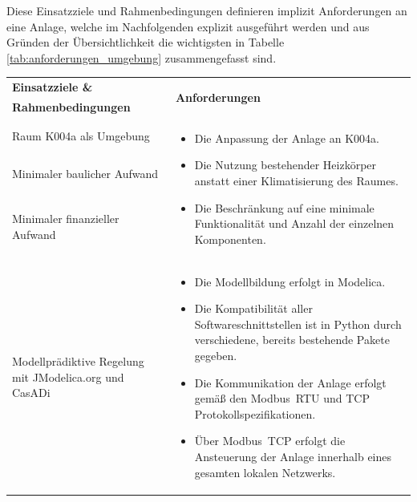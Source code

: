 Diese Einsatzziele und Rahmenbedingungen definieren implizit Anforderungen an eine Anlage, welche im Nachfolgenden explizit ausgeführt werden und aus Gründen der Übersichtlichkeit die wichtigsten in Tabelle \ref{tab:anforderungen_umgebung} zusammengefasst sind.


\begin{table}[H]
\centering
\small
\renewcommand{\arraystretch}{1.3}
\begin{tabularx}{1\textwidth}{m{}m{}}

\toprule

\textbf{Einsatzziele \&} & \multirow{2}{\hsize}{\textbf{Anforderungen}} \\ 
\textbf{Rahmenbedingungen} & \\

\cmidrule[0.5pt](r{0.25em}){1-1} 
\cmidrule[0.5pt](l{0.25em}){2-2}

Raum K004a als Umgebung  & \multirow{3}{\hsize}{
\begin{minipage}[t]{0.57\textwidth}
\begin{itemize}[itemsep=0pt,topsep=0pt,leftmargin=5mm]
	\item Die Anpassung der Anlage an K004a.
	\item Die Nutzung bestehender Heizkörper anstatt einer Klimatisierung des Raumes. 
	\item Die Beschränkung auf eine minimale Funktionalität und Anzahl der einzelnen Komponenten. 
\end{itemize}
\end{minipage}
}
 \\
	
\cmidrule[0.1pt](lr{2em}){1-1} 
Minimaler baulicher Aufwand & \\

\cmidrule[0.1pt](lr{2em}){1-1} 
Minimaler finanzieller \newline Aufwand &\\ 



\cmidrule[0.5pt](r{0.25em}){1-1} 
\cmidrule[0.5pt](l{0.25em}){2-2}

\addlinespace[4mm] Modellprädiktive Regelung mit JModelica.org und CasADi \newline & \multirow{3}{\hsize}{
\begin{minipage}[t]{0.57\textwidth}
\begin{itemize}[itemsep=0pt,topsep=0pt,leftmargin=5mm]
\item Die Modellbildung erfolgt in Modelica.
\item Die Kompatibilität aller Softwareschnittstellen ist in Python durch verschiedene, bereits bestehende Pakete gegeben.
\item Die Kommunikation der Anlage erfolgt gemäß den Modbus~RTU und TCP Protokollspezifikationen.
\item Über Modbus~TCP erfolgt die Ansteuerung der Anlage innerhalb eines gesamten lokalen Netzwerks.
\end{itemize}
\end{minipage}
}  \\


\end{tabularx}
\end{table}
